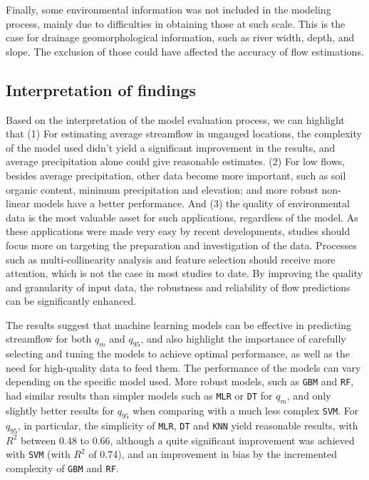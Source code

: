 \documentclass[12pt]{article}
\begin{document}
\par Finally, some environmental information was not included in the modeling process, mainly due to difficulties in obtaining those at such scale. This is the case for drainage geomorphological information, such as river width, depth, and slope. The exclusion of those could have affected the accuracy of flow estimations.

\subsection{Interpretation of findings} \label{discussion:findings}

\par Based on the interpretation of the model evaluation process, we can highlight that (1) For estimating average streamflow in ungauged locations, the complexity of the model used didn’t yield a significant improvement in the results, and average precipitation alone could give reasonable estimates. (2) For low flows, besides average precipitation, other data become more important, such as soil organic content, minimum precipitation and elevation; and more robust non-linear models have a better performance. And (3) the quality of environmental data is the most valuable asset for such applications, regardless of the model. As these applications were made very easy by recent developments, studies should focus more on targeting the preparation and investigation of the data. Processes such as multi-collinearity analysis and feature selection should receive more attention, which is not the case in most studies to date. By improving the quality and granularity of input data, the robustness and reliability of flow predictions can be significantly enhanced.

\par The results suggest that machine learning models can be effective in predicting streamflow for both $q_{m}$ and $q_{95}$, and also highlight the importance of carefully selecting and tuning the models to achieve optimal performance, as well as the need for high-quality data to feed them. The performance of the models can vary depending on the specific model used. More robust models, such as \texttt{GBM} and \texttt{RF}, had similar results than simpler models such as \texttt{MLR} or \texttt{DT} for $q_{m}$, and only slightly better results for $q_{95}$ when comparing with a much less complex \texttt{SVM}. For $q_{95}$, in particular, the simplicity of \texttt{MLR}, \texttt{DT} and \texttt{KNN} yield reasonable results, with $R^2$ between 0.48 to 0.66, although a quite significant improvement was achieved with \texttt{SVM} (with $R^2$ of 0.74), and an improvement in bias by the incremented complexity of \texttt{GBM} and \texttt{RF}.
\end{document}
